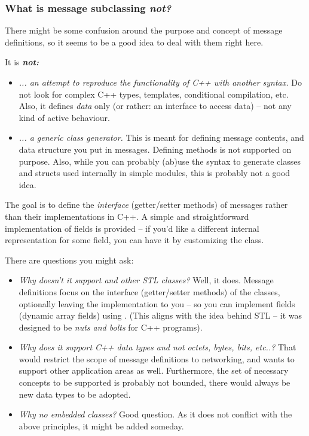 \subsubsection{What is message subclassing \textit{not?}}

There might be some confusion around the purpose and
concept of message definitions, so it seems to be a good idea
to deal with them right here.

It is \textit{\textbf{not:}}

\begin{itemize}
  \item{\textit{... an attempt to reproduce the functionality of C++ with another
     syntax.} Do not look for complex C++ types, templates, conditional compilation, etc.
     Also, it defines \textit{data} only (or rather: an interface to access
     data) -- not any kind of active behaviour.}
  \item{\textit{... a generic class generator.} This is meant for defining message
     contents, and data structure you put in messages.
     Defining methods is not supported on purpose.
     Also, while you can probably (ab)use the syntax to
     generate classes and structs used internally in simple modules,
     this is probably not a good idea.}
\end{itemize}

The goal is to define the \textit{interface} (getter/setter methods) of messages
rather than their implementations in C++. A simple and straightforward
implementation of fields is provided -- if you'd like a different internal
representation for some field, you can have it by customizing the class.

There are questions you might ask:

\begin{itemize}
  \item{\textit{Why doesn't it support  and other STL classes?}
     Well, it does. Message definitions focus on the interface
     (getter/setter methods) of the classes, optionally leaving the implementation
     to you -- so you can implement fields (dynamic array fields)
     using .
     (This aligns with the idea behind STL -- it was designed to be
     \textit{nuts and bolts} for C++ programs).}
  \item{\textit{Why does it support C++ data types and not octets,
     bytes, bits, etc..?}
     That would restrict the scope of message definitions to networking,
     and {\opp} wants to support other application areas as well.
     Furthermore, the set of necessary concepts to be supported is
     probably not bounded, there would always be new data types to
     be adopted.}
  \item{\textit{Why no embedded classes?} Good question. As it does not
     conflict with the above principles, it might be added someday.}
\end{itemize}



